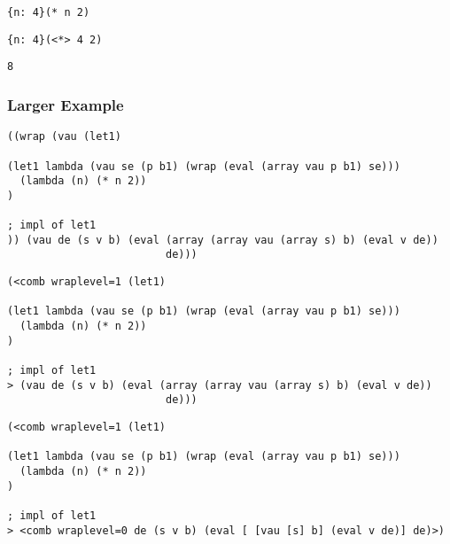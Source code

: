 \documentclass{beamer}
\begin{document}
\begin{frame}[fragile]
\footnotesize
\begin{verbatim}
{n: 4}(* n 2)
\end{verbatim}
\end{frame}

\begin{frame}[fragile]
\footnotesize
\begin{verbatim}
{n: 4}(<*> 4 2)
\end{verbatim}
\end{frame}

\begin{frame}[fragile]
\footnotesize
\begin{verbatim}
8
\end{verbatim}
\end{frame}

\begin{frame}[fragile]
\frametitle{Larger Example}
\footnotesize
\begin{verbatim}
((wrap (vau (let1)

(let1 lambda (vau se (p b1) (wrap (eval (array vau p b1) se)))
  (lambda (n) (* n 2))
)

; impl of let1
)) (vau de (s v b) (eval (array (array vau (array s) b) (eval v de))
                         de)))
\end{verbatim}
\end{frame}

\begin{frame}[fragile]
\footnotesize
\begin{verbatim}
(<comb wraplevel=1 (let1)

(let1 lambda (vau se (p b1) (wrap (eval (array vau p b1) se)))
  (lambda (n) (* n 2))
)

; impl of let1
> (vau de (s v b) (eval (array (array vau (array s) b) (eval v de))
                         de)))
\end{verbatim}
\end{frame}

\begin{frame}[fragile]
\footnotesize
\begin{verbatim}
(<comb wraplevel=1 (let1)

(let1 lambda (vau se (p b1) (wrap (eval (array vau p b1) se)))
  (lambda (n) (* n 2))
)

; impl of let1
> <comb wraplevel=0 de (s v b) (eval [ [vau [s] b] (eval v de)] de)>)
\end{verbatim}
\end{frame}
\end{document}
